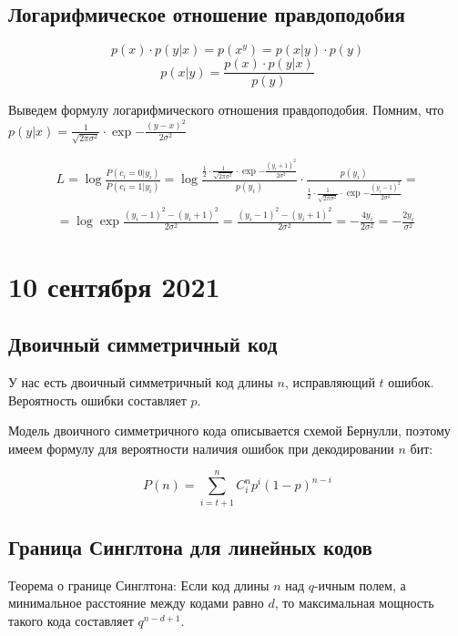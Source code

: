 \documentclass{article}
\begin{document}
\subsection*{Логарифмическое отношение правдоподобия}

$$p(x) \cdot p(y | x) = p(x ^ y) = p(x | y) \cdot p(y)$$
$$p(x | y) = \frac{p(x) \cdot p(y | x)}{p(y)}$$

Выведем формулу логарифмического отношения правдоподобия. Помним, что $p(y | x) = \frac{1}{\sqrt{2 \pi \sigma^2}} \cdot \exp{-\frac{(y - x)^2}{2\sigma^2}}$

\begin{equation*}
\begin{gathered}
L = \log\frac{P(c_i = 0 | y_i)}{P(c_i = 1 | y_i)} = \log{\frac{\frac{1}{2} \cdot \frac{1}{\sqrt{2 \pi \sigma^2}} \cdot \exp{-\frac{(y_i + 1)^2}{2\sigma^2}}}{p(y_i)} \cdot \frac{p(y_i)}{\frac{1}{2} \cdot \frac{1}{\sqrt{2 \pi \sigma^2}} \cdot \exp{-\frac{(y_i - 1)^2}{2\sigma^2}}}} =\\= \log{\exp{\frac{(y_i - 1)^2 - (y_i + 1)^2}{2\sigma^2}}} = \frac{(y_i - 1)^2 - (y_i + 1)^2}{2\sigma^2} = -\frac{4 y_i}{2\sigma^2} = -\frac{2y_i}{\sigma^2}
\end{gathered}
\end{equation*}

\newpage
\section*{10 сентября 2021}

\subsection*{Двоичный симметричный код}

У нас есть двоичный симметричный код длины $n$, исправляющий $t$ ошибок. Вероятность ошибки составляет $p$.

Модель двоичного симметричного кода описывается схемой Бернулли, поэтому имеем формулу для вероятности наличия ошибок при декодировании $n$ бит:

$$P(n) = \sum_{i = t + 1}^{n} C_i^n p^i (1-p)^{n - i}$$

\subsection*{Граница Синглтона для линейных кодов}

Теорема о границе Синглтона: Если код длины $n$ над $q$-ичным полем, а минимальное расстояние между кодами равно $d$, то максимальная мощность такого кода составляет $q^{n - d + 1}$.
\end{document}
